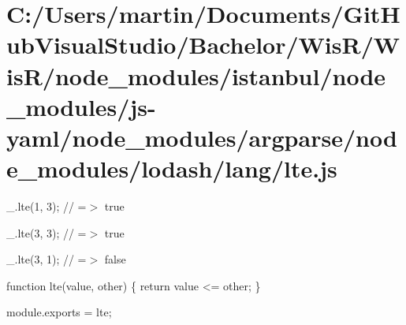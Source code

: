 \hypertarget{_c_1_2_users_2martin_2_documents_2_git_hub_visual_studio_2_bachelor_2_wis_r_2_wis_r_2node_module93e085ebcc5394c6fc4fe3ea664a16b3}{}\section{C\+:/\+Users/martin/\+Documents/\+Git\+Hub\+Visual\+Studio/\+Bachelor/\+Wis\+R/\+Wis\+R/node\+\_\+modules/istanbul/node\+\_\+modules/js-\/yaml/node\+\_\+modules/argparse/node\+\_\+modules/lodash/lang/lte.\+js}
\+\_\+.\+lte(1, 3); // =$>$ true

\+\_\+.\+lte(3, 3); // =$>$ true

\+\_\+.\+lte(3, 1); // =$>$ false


\begin{DoxyCodeInclude}

\textcolor{keyword}{function} lte(value, other) \{
  \textcolor{keywordflow}{return} value <= other;
\}

module.exports = lte;
\end{DoxyCodeInclude}
 